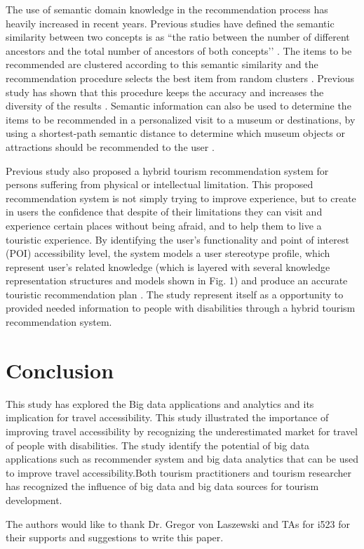 \documentclass[sigconf]{acmart}
\begin{document}
The use of semantic domain knowledge in the recommendation process has heavily increased in recent years. Previous studies have defined the semantic similarity between two concepts is as ``the ratio between the number of different ancestors and the total number of ancestors of both concepts’’ \cite{morenorecommender}. The items to be recommended are clustered according to this semantic similarity and the recommendation procedure selects the best item from random clusters \cite{Santos2018}. Previous study has shown that this procedure keeps the accuracy and increases the diversity of the results \cite{morenorecommender}. Semantic information can also be used to determine the items to be recommended in a personalized visit to a museum or destinations, by using a shortest-path semantic distance to determine which museum objects or attractions should be recommended to the user \cite{morenorecommender}. 

Previous study also proposed a hybrid tourism recommendation system for persons suffering from physical or intellectual limitation. This proposed recommendation system is not simply trying to improve experience, but to create in users the confidence that despite of their limitations they can visit and experience certain places without being afraid, and to help them to live a touristic experience. By identifying the user’s functionality and point of interest (POI) accessibility level, the system models a user stereotype profile, which represent user’s related knowledge (which is layered with several knowledge representation structures and models shown in Fig. 1) and produce an accurate touristic recommendation plan \cite{Santos2018}. The study represent itself as a opportunity to provided needed information to people with disabilities through a hybrid tourism recommendation system. 



\section{Conclusion}

This study has explored the Big data applications and analytics and its implication  for travel accessibility. This study illustrated the importance of improving travel accessibility by recognizing the underestimated market for travel of people with disabilities. The study identify the potential of big data applications such as recommender system and big data analytics that can be used to improve travel accessibility.Both tourism practitioners and tourism researcher has recognized the
influence of big data and big data sources for tourism development. 


\begin{acks}

  The authors would like to thank Dr. Gregor von Laszewski and TAs for i523 for their
  supports and suggestions to write this paper.

\end{acks}


 

\appendix
\end{document}

